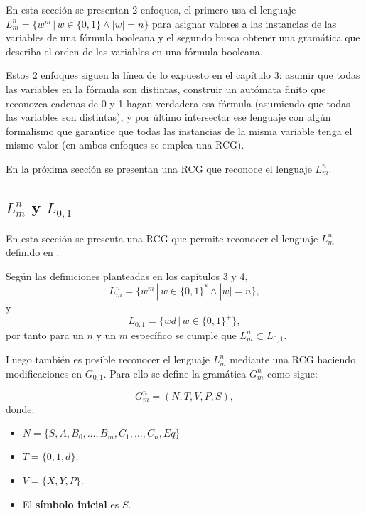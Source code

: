 En esta sección se presentan 2 enfoques, el primero usa el lenguaje $L^n_m=\{w^m\,|\,w\in\{0,1\} \wedge |w|=n\}$ para asignar valores
a las instancias de las variables de una fórmula booleana y el segundo busca obtener una gramática
que describa el orden de las variables en una fórmula booleana.

Estos 2 enfoques siguen la línea de lo expuesto en el capítulo 3:
asumir que todas las variables en
la fórmula son distintas, construir un autómata finito que reconozca cadenas de 0 y 1 hagan verdadera esa
fórmula (asumiendo que todas las variables son distintas), y por último intersectar ese lenguaje con algún
formalismo que garantice que todas las instancias de la misma variable tenga el mismo valor (en ambos enfoques
se emplea una RCG).

En la próxima sección se presentan una RCG que reconoce el lenguaje $L^n_m$.

\subsection{$L^n_m$ y $L_{0,1}$}

En esta sección se presenta una RCG que permite reconocer el lenguaje $L^n_m$ definido en \cite{aSMSAT}.

Según las definiciones planteadas en los capítulos 3 y 4,
$$L^n_m=\{w^m\,|\,w\in\{0,1\}^* \wedge |w|=n\},$$
y
$$L_{0,1}=\{wd \,|\,w\in \{0,1\}^+\},$$
por tanto para un $n$ y un $m$ específico se cumple que $L^n_m \subset L_{0,1}$.

Luego también es posible reconocer el lenguaje $L^n_m$ mediante una RCG haciendo modificaciones en $G_{0,1}$. Para ello
se define la gramática $G^n_m$ como sigue:

\[
    G^n_m = (N, T, V, P, S),
\]
donde:

\begin{itemize}
    \item $N=\{S,A,B_0,\ldots,B_m,C_1,\ldots,C_n,Eq\}$
    \item $T=\{0,1,d\}$.
    \item $V=\{X,Y,P\}$.
    \item El \textbf{símbolo inicial} es $S$.
\end{itemize}

